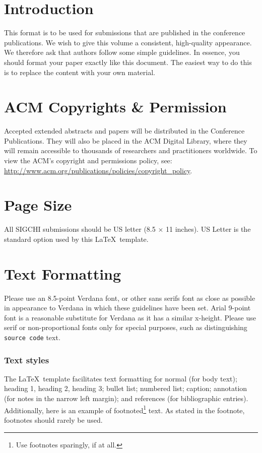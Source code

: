 \documentclass[sigchi-a, authorversion]{acmart}
\begin{document}
\section{Introduction}
This format is to be used for submissions that are published in the
conference publications. We wish to give this volume a consistent,
high-quality appearance. We therefore ask that authors follow some
simple guidelines. In essence, you should format your paper exactly
like this document. The easiest way to do this is to replace the
content with your own material.


\section{ACM Copyrights \& Permission}
Accepted extended abstracts and papers will be distributed in the
Conference Publications. They will also be placed in the ACM Digital
Library, where they will remain accessible to thousands of researchers
and practitioners worldwide. To view the ACM's copyright and
permissions policy, see:
\url{http://www.acm.org/publications/policies/copyright_policy}.


\section{Page Size}
All SIGCHI submissions should be US letter (8.5 $\times$ 11
inches). US Letter is the standard option used by this \LaTeX\
template.

\section{Text Formatting}
Please use an 8.5-point Verdana font, or other sans serifs font as
close as possible in appearance to Verdana in which these guidelines
have been set. Arial 9-point font is a reasonable substitute for
Verdana as it has a similar x-height. Please use serif or
non-proportional fonts only for special purposes, such as
distinguishing \texttt{source code} text.

\subsubsection{Text styles}
The \LaTeX\ template facilitates text formatting for normal (for body
text); heading 1, heading 2, heading 3; bullet list; numbered list;
caption; annotation (for notes in the narrow left margin); and
references (for bibliographic entries). Additionally, here is an
example of footnoted\footnote{Use footnotes sparingly, if at all.}
text. As stated in the footnote, footnotes should rarely be used.
\end{document}
